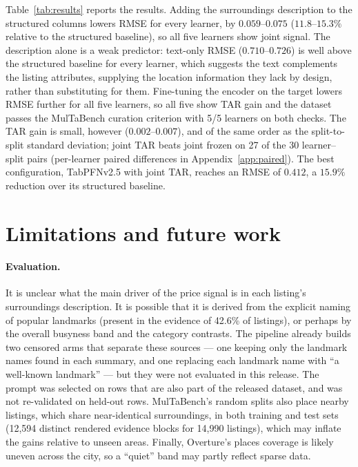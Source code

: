 \documentclass{article}
\begin{document}
Table~\ref{tab:results} reports the results.
Adding the surroundings description to the structured columns lowers RMSE for every learner,
by $0.059$--$0.075$ ($11.8$--$15.3\%$ relative to the structured baseline), so all five learners show joint signal.
The description alone is a weak predictor: text-only RMSE ($0.710$--$0.726$) is well above the structured baseline
for every learner, which suggests the text complements the listing attributes, supplying the location information
they lack by design, rather than substituting for them.
Fine-tuning the encoder on the target lowers RMSE further for all five learners, so all five show TAR gain and the
dataset passes the MulTaBench curation criterion with 5/5 learners on both checks.
The TAR gain is small, however ($0.002$--$0.007$), and of the same order as the split-to-split standard deviation;
joint TAR beats joint frozen on 27 of the 30 learner--split pairs (per-learner paired differences in Appendix~\ref{app:paired}).
The best configuration, TabPFNv2.5 with joint TAR, reaches an RMSE of $0.412$, a $15.9\%$ reduction over its structured baseline.


\section{Limitations and future work}
\label{sec:limitations}

\paragraph{Evaluation.} It is unclear what the main driver of the price signal is in each listing's surroundings description.
It is possible that it is derived from the explicit naming of popular landmarks (present in the evidence of 42.6\% of listings),
or perhaps by the overall busyness band and the category contrasts.
The pipeline already builds two censored arms that separate these sources --- one keeping only the landmark names found in each summary,
and one replacing each landmark name with ``a well-known landmark'' --- but they were not evaluated in this release.
The prompt was selected on rows that are also part of the released dataset, and was not re-validated on held-out rows.
MulTaBench's random splits also place nearby listings, which share near-identical surroundings, in both training and test sets
(12,594 distinct rendered evidence blocks for 14,990 listings), which may inflate the gains relative to unseen areas.
Finally, Overture's places coverage is likely uneven across the city, so a ``quiet'' band may partly reflect sparse data.
\end{document}
